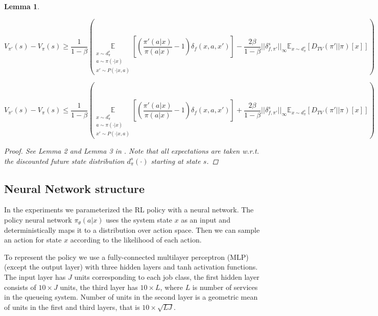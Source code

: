 \documentclass[11pt]{article}
\newcommand{\E}{\mathbb{E}}
\newtheorem{lemma}{Lemma}
\theoremstyle{definition}
\numberwithin{equation}{section}
\begin{document}
\begin{lemma}\label{lem1}

\begin{equation}\label{eqV_V}
 V_{\pi'}(s) - V_\pi(s) \geq \frac{1}{1 - \beta} \left( \underset{\substack{ x\sim d^s_\pi\\ a\sim \pi(\cdot|x)\\x'\sim P(\cdot|x, a)}}{\E}\left[\left( \frac{\pi'(a| x)}{\pi(a|x)}-1 \right)\delta_f(x, a, x') \right]  - \frac{2\beta}{1- \beta}||\delta_{f,\pi'}^s ||_\infty \E_{x\sim d^s_\pi} [D_{TV}(\pi'||\pi)[x]] \right)
\end{equation}

\begin{equation}\label{eqV_V2}
V_{\pi'}(s) - V_\pi(s) \leq  \frac{1}{1 - \beta} \left( \underset{\substack{ x\sim d^s_\pi\\ a\sim \pi(\cdot|x)\\x'\sim P(\cdot|x, a)}}{\E}\left[\left( \frac{\pi'(a| x)}{\pi(a|x)}-1 \right)\delta_f(x, a, x') \right]  + \frac{2\beta}{1- \beta}||\delta_{f,\pi'}^s ||_\infty \E_{x\sim d^s_\pi} [D_{TV}(\pi'||\pi)[x]] \right)
\end{equation}




\begin{proof}

See Lemma 2 and Lemma 3 in \cite{Achiam2017}. Note that all expectations are taken w.r.t.  the discounted future state distribution $d_\pi^s(\cdot)$ starting at state $s$.
\end{proof}
\end{lemma}
\subsection{Neural Network structure}\label{sec:nn}







In the experiments we parameterized the RL policy with a neural network. The policy neural network $\pi_\theta(a|x)$ uses the system state $x$ as an input and deterministically maps it to a distribution over action space. Then we can sample an action for state $x$ according to the likelihood of each action.



To represent the policy we use a fully-connected multilayer perceptron (MLP) (except the output layer) with three hidden layers and tanh activation functions. The input layer has $J$ units corresponding to each job class, the first hidden layer consists of $10\times J$ units, the third layer has $10\times L$, where $L$ is  number of services in the queueing system. Number of units in the  second layer is a geometric mean of units in the first and third layers, that is $10\times \sqrt{LJ}$.
\end{document}
